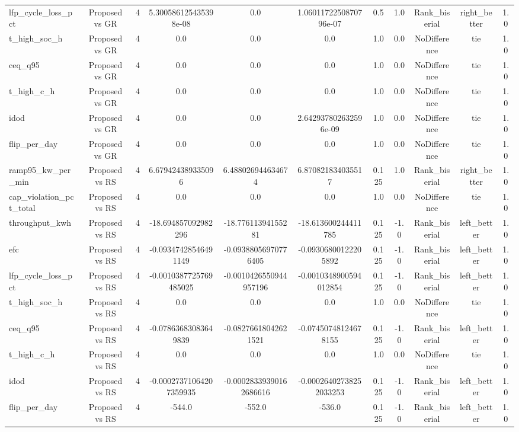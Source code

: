 \begin{table}[t]
\begin{tabular}{lcccccccccc}
lfp\_cycle\_loss\_pct & Proposed vs GR & 4 & 5.300586125435398e-08 & 0.0 & 1.0601172250870796e-07 & 0.5 & 1.0 & Rank\_biserial & right\_better & 1.0 \\
t\_high\_soc\_h & Proposed vs GR & 4 & 0.0 & 0.0 & 0.0 & 1.0 & 0.0 & NoDifference & tie & 1.0 \\
ceq\_q95 & Proposed vs GR & 4 & 0.0 & 0.0 & 0.0 & 1.0 & 0.0 & NoDifference & tie & 1.0 \\
t\_high\_c\_h & Proposed vs GR & 4 & 0.0 & 0.0 & 0.0 & 1.0 & 0.0 & NoDifference & tie & 1.0 \\
idod & Proposed vs GR & 4 & 0.0 & 0.0 & 2.642937802632596e-09 & 1.0 & 0.0 & NoDifference & tie & 1.0 \\
flip\_per\_day & Proposed vs GR & 4 & 0.0 & 0.0 & 0.0 & 1.0 & 0.0 & NoDifference & tie & 1.0 \\
ramp95\_kw\_per\_min & Proposed vs RS & 4 & 6.679424389335096 & 6.488026944634674 & 6.870821834035517 & 0.125 & 1.0 & Rank\_biserial & right\_better & 1.0 \\
cap\_violation\_pct\_total & Proposed vs RS & 4 & 0.0 & 0.0 & 0.0 & 1.0 & 0.0 & NoDifference & tie & 1.0 \\
throughput\_kwh & Proposed vs RS & 4 & -18.694857092982296 & -18.77611394155281 & -18.613600244411785 & 0.125 & -1.0 & Rank\_biserial & left\_better & 1.0 \\
efc & Proposed vs RS & 4 & -0.09347428546491149 & -0.09388056970776405 & -0.09306800122205892 & 0.125 & -1.0 & Rank\_biserial & left\_better & 1.0 \\
lfp\_cycle\_loss\_pct & Proposed vs RS & 4 & -0.0010387725769485025 & -0.0010426550944957196 & -0.0010348900594012854 & 0.125 & -1.0 & Rank\_biserial & left\_better & 1.0 \\
t\_high\_soc\_h & Proposed vs RS & 4 & 0.0 & 0.0 & 0.0 & 1.0 & 0.0 & NoDifference & tie & 1.0 \\
ceq\_q95 & Proposed vs RS & 4 & -0.07863683083649839 & -0.08276618042621521 & -0.07450748124678155 & 0.125 & -1.0 & Rank\_biserial & left\_better & 1.0 \\
t\_high\_c\_h & Proposed vs RS & 4 & 0.0 & 0.0 & 0.0 & 1.0 & 0.0 & NoDifference & tie & 1.0 \\
idod & Proposed vs RS & 4 & -0.00027371064207359935 & -0.00028339390162686616 & -0.00026402738252033253 & 0.125 & -1.0 & Rank\_biserial & left\_better & 1.0 \\
flip\_per\_day & Proposed vs RS & 4 & -544.0 & -552.0 & -536.0 & 0.125 & -1.0 & Rank\_biserial & left\_better & 1.0 \\

\end{tabular}
\end{table}
